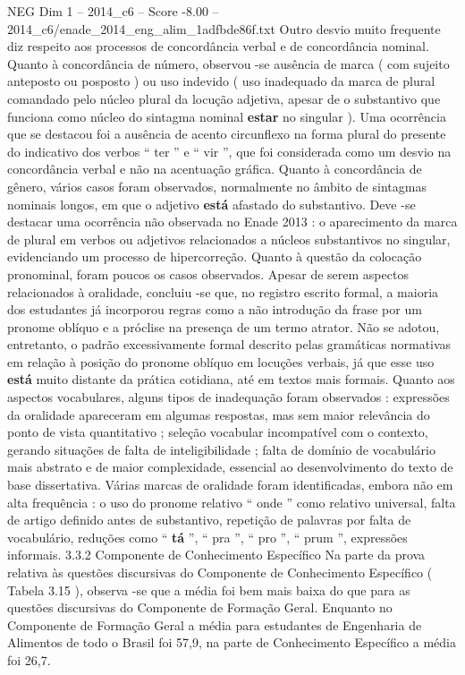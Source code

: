 \begin{textsample}{NEG Dim 1 – 2014\_c6 – Score -8.00 – 2014\_c6/enade\_2014\_eng\_alim\_1adfbde86f.txt}
Outro desvio muito frequente diz respeito aos processos de concordância verbal e de concordância nominal.
Quanto à concordância de número, observou -se ausência de marca ( com sujeito anteposto ou posposto ) ou uso indevido ( uso inadequado da marca de plural comandado pelo núcleo plural da locução adjetiva, apesar de o substantivo que funciona como núcleo do sintagma nominal \textbf{estar} no singular ).
Uma ocorrência que se destacou foi a ausência de acento circunflexo na forma plural do presente do indicativo dos verbos “ ter ” e “ vir ”, que foi considerada como um desvio na concordância verbal e não na acentuação gráfica.
Quanto à concordância de gênero, vários casos foram observados, normalmente no âmbito de sintagmas nominais longos, em que o adjetivo \textbf{está} afastado do substantivo.
Deve -se destacar uma ocorrência não observada no Enade 2013 : o aparecimento da marca de plural em verbos ou adjetivos relacionados a núcleos substantivos no singular, evidenciando um processo de hipercorreção.
Quanto à questão da colocação pronominal, foram poucos os casos observados.
Apesar de serem aspectos relacionados à oralidade, concluiu -se que, no registro escrito formal, a maioria dos estudantes já incorporou regras como a não introdução da frase por um pronome oblíquo e a próclise na presença de um termo atrator.
Não se adotou, entretanto, o padrão excessivamente formal descrito pelas gramáticas normativas em relação à posição do pronome oblíquo em locuções verbais, já que esse uso \textbf{está} muito distante da prática cotidiana, até em textos mais formais.
Quanto aos aspectos vocabulares, alguns tipos de inadequação foram observados : expressões da oralidade apareceram em algumas respostas, mas sem maior relevância do ponto de vista quantitativo ; seleção vocabular incompatível com o contexto, gerando situações de falta de inteligibilidade ; falta de domínio de vocabulário mais abstrato e de maior complexidade, essencial ao desenvolvimento do texto de base dissertativa.
Várias marcas de oralidade foram identificadas, embora não em alta frequência : o uso do pronome relativo “ onde ” como relativo universal, falta de artigo definido antes de substantivo, repetição de palavras por falta de vocabulário, reduções como “ \textbf{tá} ”, “ pra ”, “ pro ”, “ prum ”, expressões informais. 3.3.2 Componente de Conhecimento Específico Na parte da prova relativa às questões discursivas do Componente de Conhecimento Específico ( Tabela 3.15 ), observa -se que a média foi bem mais baixa do que para as questões discursivas do Componente de Formação Geral.
Enquanto no Componente de Formação Geral a média para estudantes de Engenharia de Alimentos de todo o Brasil foi 57,9, na parte de Conhecimento Específico a média foi 26,7.

\end{textsample}
